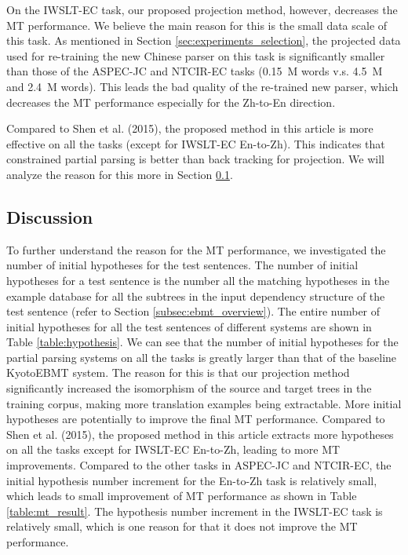 \documentclass[english]{jnlp_1.4}
\begin{document}
{On the IWSLT-EC task, our proposed projection method, however, decreases the MT
performance. We believe the main reason for this is the small data scale of this task. As
mentioned in Section \ref{sec:experiments_selection}, the projected data used for re-training 
the new Chinese parser on this task is significantly smaller than those of the ASPEC-JC and NTCIR-EC
tasks (0.15~M words v.s. 4.5~M and 2.4~M words). This leads the bad quality of the re-trained
new parser, which decreases the MT performance especially for the Zh-to-En direction.}

{Compared to Shen et al. (2015), the proposed method in this article is
more effective on all the tasks (except for IWSLT-EC En-to-Zh). This indicates that 
constrained partial parsing is better than back tracking for projection.
We will analyze the reason for this more in Section \ref{sec:experiments_hypotheses}.}


\subsection{{Discussion}}
\label{sec:experiments_hypotheses}

To further understand the reason for the MT {performance}, we investigated the number
of initial hypotheses for the test sentences. The number of initial hypotheses for a test sentence is the number
all the matching hypotheses in the example database for all the subtrees in the input 
dependency structure of the test sentence (refer to Section \ref{subsec:ebmt_overview}).
The entire number of initial hypotheses for all the test sentences of different systems are shown 
in Table \ref{table:hypothesis}. We can see that the number of initial hypotheses for the partial 
parsing systems on {all the tasks}
is greatly larger than that of the baseline KyotoEBMT system. The reason for this is that 
our projection method significantly increased the isomorphism of the source and target 
trees in the training corpus, making more translation examples being extractable. 
More initial hypotheses are potentially to improve the final MT performance. 
{Compared to Shen et al. (2015), the proposed method in this article
extracts more hypotheses on all the tasks except for IWSLT-EC En-to-Zh, leading to more MT improvements.}
Compared to the other tasks {in ASPEC-JC and NTCIR-EC}, the initial hypothesis number increment 
for the En-to-Zh task is relatively small, which leads to small improvement of MT performance as shown 
in Table \ref{table:mt_result}. {The hypothesis number increment in the IWSLT-EC task
is relatively small, which is one reason for that it does not improve the MT performance.}
\end{document}
